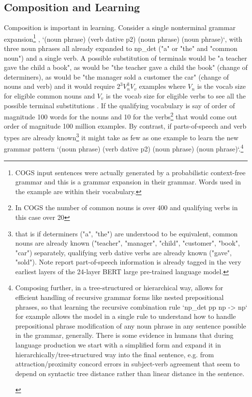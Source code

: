 \documentclass[11pt]{article}
\begin{document}
\subsection{Composition and Learning}
\label{composition_and_learning}
Composition is important in learning. Consider a single nonterminal grammar expansion\footnote{COGS input sentences were actually generated by a probabilistic context-free grammar and this is a grammar expansion in their grammar. Words used in the example are within their vocabulary.} , `(noun phrase) (verb dative p2) (noun phrase) (noun phrase)`, with three noun phrases all already expanded to np\_det ("a" or "the" and "common noun") and a single verb. A possible substitution of terminals would be "a teacher gave the child a book", as would be "the teacher gave a child the book" (change of determiners), as would be "the manager sold a customer the car" (change of nouns and verb) and it would require $2^3 V_n^3V_v $ examples where $V_n$ is the vocab size for eligible common nouns and $V_v$ is the vocab size for eligible verbs to see all the possible terminal substitutions . If the qualifying vocabulary is say of order of magnitude 100 words for the nouns and 10 for the verbs\footnote{In COGS the number of common nouns is over 400 and qualifying verbs in this case over 20} that would come out order of magnitude 100 million examples. By contrast, if parts-of-speech and verb types are already known\footnote{that is if determiners ("a", "the") are understood to be equivalent, common nouns are already known ("teacher", "manager", "child", "customer", "book", "car") separately, qualifying verb dative verbs are already known ("gave", "sold"). Note \citep{tenney2019bertrediscoversclassicalnlp} report part-of-speech information is already tagged in the very earliest layers of the 24-layer BERT large pre-trained language model.} it might take as few as one example to learn the new grammar pattern `(noun phrase) (verb dative p2) (noun phrase) (noun phrase)`.\footnote{\begin{footnotesize}Composing further, in a tree-structured or hierarchical way, allows for efficient handling of recursive grammar forms like nested prepositional phrases, so that learning the recursive combination rule `np\_det pp np -> np` for example allows the model in a single rule to understand how to handle prepositional phrase modification of any noun phrase in any sentence possible in the grammar, generally. 
There is some evidence in humans that during language production we start with a simplified form and expand it in hierarchically/tree-structured way into the final sentence, e.g. from attraction/proximity concord errors in subject-verb agreement that seem to depend on syntactic tree distance rather than linear distance in the sentence\citep{FRANCK2006173}\citep{VIGLIOCCO1998B13}.

\end{footnotesize}}
\end{document}
